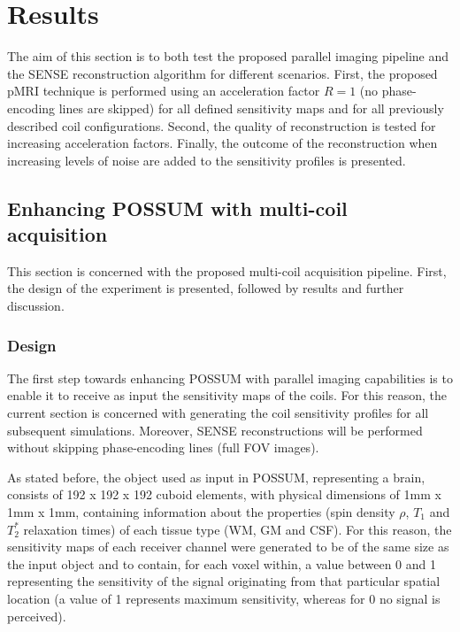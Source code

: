 \chapter{Results}
\label{chapterlabel5}

The aim of this section is to both test the proposed parallel imaging pipeline and the SENSE reconstruction algorithm for different scenarios. First, the proposed pMRI technique is performed using an acceleration factor $R = 1$ (no phase-encoding lines are skipped) for all defined sensitivity maps and for all previously described coil configurations. Second, the quality of reconstruction is tested for increasing acceleration factors. Finally, the outcome of the reconstruction when increasing levels of noise are added to the sensitivity profiles is presented. 

\section{Enhancing POSSUM with multi-coil acquisition}
This section is concerned with the proposed multi-coil acquisition pipeline. First, the design of the experiment is presented, followed by results and further discussion.

\subsection{Design}
The first step towards enhancing POSSUM with parallel imaging capabilities is to enable it to receive as input the sensitivity maps of the coils. For this reason, the current section is concerned with generating the coil sensitivity profiles for all subsequent simulations. Moreover, SENSE reconstructions will be performed without skipping phase-encoding lines (full FOV images).

As stated before, the object used as input in POSSUM, representing a brain, consists of 192 x 192 x 192 cuboid elements, with physical dimensions of 1mm x 1mm x 1mm, containing information about the properties (spin density $\rho$, $T_1$ and $T_2^*$ relaxation times) of each tissue type (WM, GM and CSF). For this reason, the sensitivity maps of each receiver channel were generated to be of the same size as the input object and to contain, for each voxel within, a value between 0 and 1 representing the sensitivity of the signal originating from that particular spatial location (a value of 1 represents maximum sensitivity, whereas for 0 no signal is perceived).

